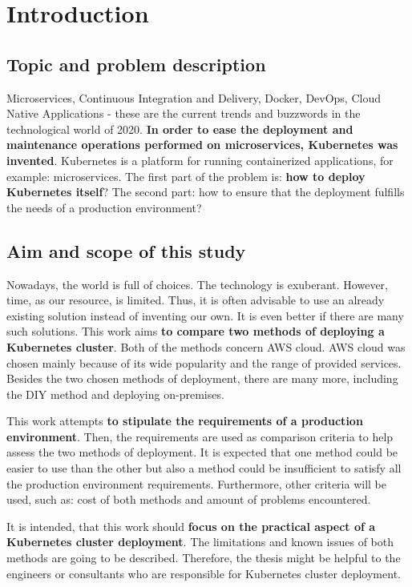 \section{Introduction}


\subsection{Topic and problem description}

Microservices, Continuous Integration and Delivery, Docker, DevOps, Cloud Native Applications - these are the current trends and buzzwords in the technological world of 2020. \textbf{In order to ease the deployment and maintenance operations performed on microservices, Kubernetes was invented}. Kubernetes is a platform for running containerized applications, for example: microservices. The first part of the problem is: \textbf{how to deploy Kubernetes itself}? The second part: how to ensure that the deployment fulfills the needs of a production environment?


\subsection{Aim and scope of this study}


Nowadays, the world is full of choices. The technology is exuberant. However, time, as our resource, is limited. Thus, it is often advisable to use an already existing solution instead of inventing our own. It is even better if there are many such solutions. This work aims \textbf{to compare two methods of deploying a Kubernetes cluster}. Both of the methods concern AWS cloud. AWS cloud was chosen mainly because of its wide popularity and the range of provided services. Besides the two chosen methods of deployment, there are many more, including the DIY method and deploying on-premises.

This work attempts \textbf{to stipulate the requirements of a production environment}. Then, the requirements are used as comparison criteria to help assess the two methods of deployment. It is expected that one method could be easier to use than the other but also a method could be insufficient to satisfy all the production environment requirements. Furthermore, other criteria will be used, such as: cost of both methods and amount of problems encountered.

It is intended, that this work should \textbf{focus on the practical aspect of a Kubernetes cluster deployment}. The limitations and known issues of both methods are going to be described. Therefore, the thesis might be helpful to the engineers or consultants who are responsible for Kubernetes cluster deployment.

